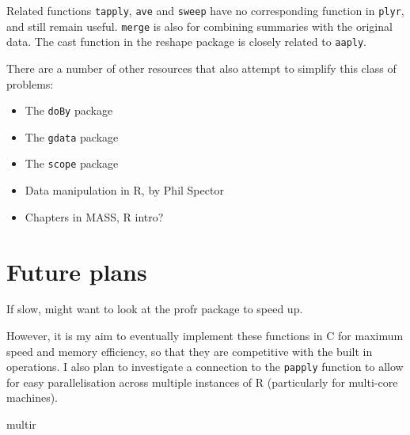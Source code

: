 \documentclass{scrartcl}
\begin{document}
Related functions {\tt tapply}, {\tt ave} and {\tt sweep} have no corresponding function in {\tt plyr}, and still remain useful. {\tt merge} is also for combining summaries with the original data.  The cast function in the reshape package \citep{reshape} is closely related to {\tt aaply}.

There are a number of other resources that also attempt to simplify this class of problems:

\begin{itemize}
  \item The {\tt doBy} package
  \item The {\tt gdata} package
  \item The {\tt scope} package
  \item Data manipulation in R, by Phil Spector
  \item Chapters in MASS, R intro?
  
\end{itemize}

\section{Future plans}
\label{sec:future}

If slow, might want to look at the profr package to speed up.  

However, it is my aim to eventually implement these functions in C for maximum speed and memory efficiency, so that they are competitive with the built in operations.  I also plan to investigate a connection to the {\tt papply} function to allow for easy parallelisation across multiple instances of R (particularly for multi-core machines).

multir


\end{document}
